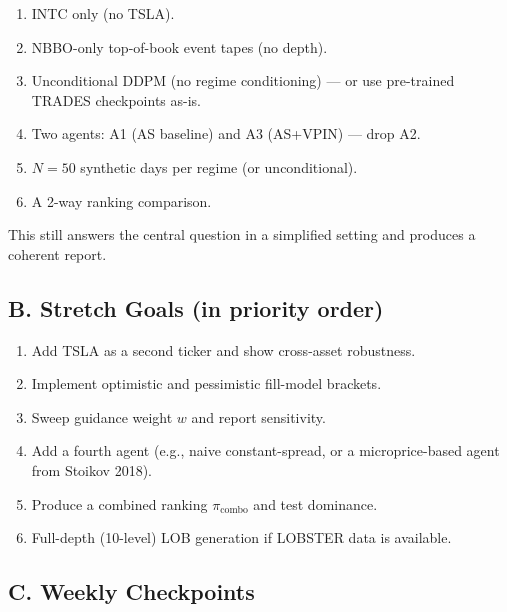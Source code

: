 \documentclass[11pt,a4paper]{article}
\begin{document}
\begin{enumerate}[nosep]
  \item INTC only (no TSLA).
  \item NBBO-only top-of-book event tapes (no depth).
  \item Unconditional DDPM (no regime conditioning) --- or use pre-trained TRADES checkpoints as-is.
  \item Two agents: A1 (AS baseline) and A3 (AS+VPIN) --- drop A2.
  \item $N = 50$ synthetic days per regime (or unconditional).
  \item A 2-way ranking comparison.
\end{enumerate}

This still answers the central question in a simplified setting and produces a coherent report.

\subsection*{B. Stretch Goals (in priority order)}

\begin{enumerate}[nosep]
  \item Add TSLA as a second ticker and show cross-asset robustness.
  \item Implement optimistic and pessimistic fill-model brackets.
  \item Sweep guidance weight $w$ and report sensitivity.
  \item Add a fourth agent (e.g., naive constant-spread, or a microprice-based agent from Stoikov 2018).
  \item Produce a combined ranking $\pi_{\text{combo}}$ and test dominance.
  \item Full-depth (10-level) LOB generation if LOBSTER data is available.
\end{enumerate}

\subsection*{C. Weekly Checkpoints}
\end{document}

